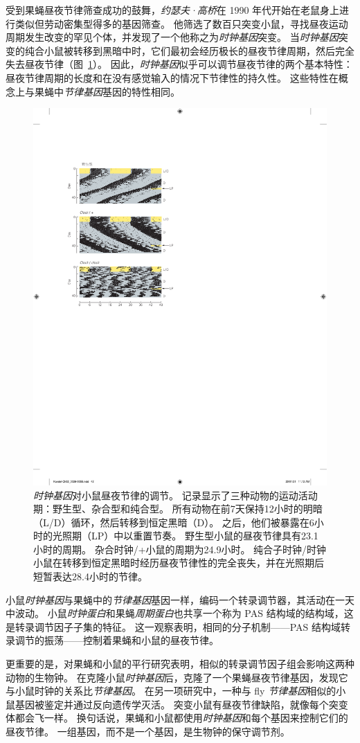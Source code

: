 受到果蝇昼夜节律筛查成功的鼓舞，\textit{约瑟夫·高桥}在 1990 年代开始在老鼠身上进行类似但劳动密集型得多的基因筛查。
他筛选了数百只突变小鼠，寻找昼夜运动周期发生改变的罕见个体，并发现了一个他称之为\textit{时钟基因}突变。
当\textit{时钟基因}突变的纯合小鼠被转移到黑暗中时，它们最初会经历极长的昼夜节律周期，然后完全失去昼夜节律（图~\ref{fig:2_12}）。
因此，\textit{时钟基因}似乎可以调节昼夜节律的两个基本特性：昼夜节律周期的长度和在没有感觉输入的情况下节律性的持久性。
这些特性在概念上与果蝇中\textit{节律基因}基因的特性相同。


\begin{figure}[htbp]
	\centering
	\includegraphics[width=0.5\linewidth]{chap02/fig_2_12}
	\caption{\textit{时钟基因}对小鼠昼夜节律的调节。
		记录显示了三种动物的运动活动期：野生型、杂合型和纯合型。
		所有动物在前7天保持12小时的明暗（L/D）循环，然后转移到恒定黑暗（D）。
		之后，他们被暴露在6小时的光照期（LP）中以重置节奏。
		野生型小鼠的昼夜节律具有23.1小时的周期。
		杂合时钟/+小鼠的周期为24.9小时。
		纯合子时钟/时钟小鼠在转移到恒定黑暗时经历昼夜节律性的完全丧失，并在光照期后短暂表达28.4小时的节律\cite{takahashi1994forward}。}
	\label{fig:2_12}
\end{figure}


小鼠\textit{时钟基因}与果蝇中的\textit{节律基因}基因一样，编码一个转录调节器，其活动在一天中波动。
小鼠\textit{时钟蛋白}和果蝇\textit{周期蛋白}也共享一个称为 PAS 结构域的结构域，这是转录调节因子子集的特征。
这一观察表明，相同的分子机制——PAS 结构域转录调节的振荡——控制着果蝇和小鼠的昼夜节律。


更重要的是，对果蝇和小鼠的平行研究表明，相似的转录调节因子组会影响这两种动物的生物钟。
在克隆小鼠\textit{时钟基因}后，克隆了一个果蝇昼夜节律基因，发现它与小鼠时钟的关系比\textit{节律基因}。
在另一项研究中，一种与 fly \textit{节律基因}相似的小鼠基因被鉴定并通过反向遗传学灭活。
突变小鼠有昼夜节律缺陷，就像每个突变体都会飞一样。 
换句话说，果蝇和小鼠都使用\textit{时钟基因}和每个基因来控制它们的昼夜节律。
一组基因，而不是一个基因，是生物钟的保守调节剂。


